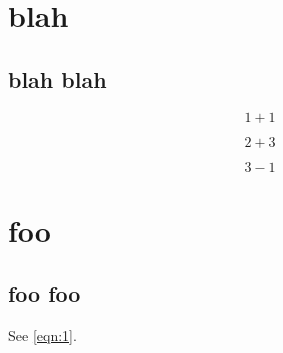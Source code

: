 \documentclass{scrreprt}
\begin{document}
\chapter{blah}
\section{blah blah}

\begin{equation}\label{eqn:1}
1 + 1
\end{equation}

\begin{equation}\label{eqn:2}
2 + 3
\end{equation}

\begin{equation}\label{eqn:3}
3 - 1
\end{equation}

\chapter{foo}
\section{foo foo}

See \cref{eqn:1}.
\end{document}
